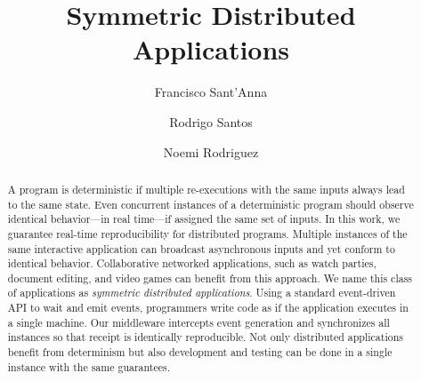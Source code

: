 \documentclass[sigplan,screen]{acmart}
\begin{document}
\title{Symmetric Distributed Applications}

\author{Francisco Sant'Anna}

\author{Rodrigo Santos}

\author{Noemi Rodriguez}


\begin{abstract}
A program is deterministic if multiple re-executions with the same inputs
always lead to the same state.
Even concurrent instances of a deterministic program should observe identical
behavior---in real time---if assigned the same set of inputs.
%
In this work, we guarantee real-time reproducibility for distributed programs.
Multiple instances of the same interactive application can broadcast
asynchronous inputs and yet conform to identical behavior.
Collaborative networked applications, such as watch parties, document editing,
and video games can benefit from this approach.
We name this class of applications as \emph{symmetric distributed applications}.
%
Using a standard event-driven API to wait and emit events, programmers write
code as if the application executes in a single machine.
Our middleware intercepts event generation and synchronizes all instances so
that receipt is identically reproducible.
Not only distributed applications benefit from determinism but also development
and testing can be done in a single instance with the same guarantees.
\end{abstract}

\maketitle
\end{document}
